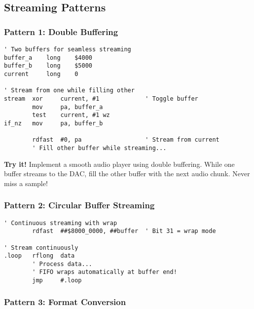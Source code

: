 \documentclass[11pt]{book}
\begin{document}
\hypertarget{streaming-patterns}{%
\subsection{Streaming Patterns}\label{streaming-patterns}}

\hypertarget{pattern-1-double-buffering}{%
\subsubsection{Pattern 1: Double
Buffering}\label{pattern-1-double-buffering}}

\begin{lstlisting}
' Two buffers for seamless streaming
buffer_a    long    $4000
buffer_b    long    $5000
current     long    0

' Stream from one while filling other
stream  xor     current, #1             ' Toggle buffer
        mov     pa, buffer_a
        test    current, #1 wz
if_nz   mov     pa, buffer_b
        
        rdfast  #0, pa                  ' Stream from current
        ' Fill other buffer while streaming...
\end{lstlisting}

\textbf{Try it!} Implement a smooth audio player using double buffering.
While one buffer streams to the DAC, fill the other buffer with the next
audio chunk. Never miss a sample!

\hypertarget{pattern-2-circular-buffer-streaming}{%
\subsubsection{Pattern 2: Circular Buffer
Streaming}\label{pattern-2-circular-buffer-streaming}}

\begin{lstlisting}
' Continuous streaming with wrap
        rdfast  ##$8000_0000, ##buffer  ' Bit 31 = wrap mode
        
' Stream continuously
.loop   rflong  data
        ' Process data...
        ' FIFO wraps automatically at buffer end!
        jmp     #.loop
\end{lstlisting}

\hypertarget{pattern-3-format-conversion}{%
\subsubsection{Pattern 3: Format
Conversion}\label{pattern-3-format-conversion}}
\end{document}
